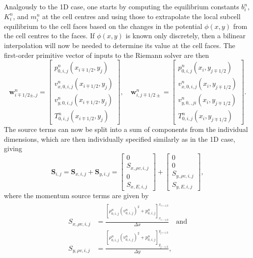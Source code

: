 Analgously to the 1D case, one starts by computing the equilibrium constants $b_i^n$, $K_i^n$, and $m_i^n$ at the cell centres and using those to extrapolate the local subcell equilibrium to the cell faces based on the changes in the potential $\phi(x,y)$ from the cell centres to the faces. If $\phi(x,y)$ is known only discretely, then a bilinear interpolation will now be needed to determine its value at the cell faces. The first-order primitive vector of inputs to the Riemann solver are then
\begin{equation} \label{eq:primitives2D1}
\mathbf{w}_{i\mp1/2\pm,j}^n=
\begin{bmatrix}
p_{0,i,j}^n(x_{i\mp1/2},y_j) \\ v_{x,0,i,j}^n(x_{i\mp1/2},y_j) \\ v_{y,0,i,j}^n(x_{i\mp1/2},y_j) \\ T_{0,i,j}^n(x_{i\mp1/2},y_j)
\end{bmatrix}
, \quad \mathbf{w}_{i,j\mp1/2\pm}^n=
\begin{bmatrix}
p_{0,i,j}^n(x_i,y_{j\mp1/2}) \\ v_{x,0,i,j}^n(x_i,y_{j\mp1/2}) \\ v_{y,0,,ji}^n(x_i,y_{j\mp1/2}) \\ T_{0,i,j}^n(x_i,y_{j\mp1/2})
\end{bmatrix}.
\end{equation}
The source terms can now be split into a sum of components from the individual dimensions, which are then individually specified similarly as in the 1D case, giving
\begin{equation}
\mathbf{S}_{i,j}=\mathbf{S}_{x,i,j}+\mathbf{S}_{y,i,j}=
\begin{bmatrix}
0 \\ S_{x,\rho v,i,j} \\ 0 \\ S_{x,E,i,j}
\end{bmatrix} +
\begin{bmatrix}
0 \\ 0 \\ S_{y,\rho v,i,j} \\ S_{y,E,i,j}
\end{bmatrix},
\end{equation}
where the momentum source terms are given by
\begin{align}
\begin{split}
S_{x,\rho v,i,j}&=\frac{\left[\rho_{0,i,j}^n(v_{0,i,j}^n)^2+p_{0,i,j}^n\right]_{x_{i-1/2}}^{x_{i+1/2}}}{\Delta x} \quad \textrm{and} \\
S_{y,\rho v,i,j}&=\frac{\left[\rho_{0,i,j}^n(v_{0,i,j}^n)^2+p_{0,i,j}^n\right]_{y_{j-1/2}}^{y_{j+1/2}}}{\Delta y},
\end{split}
\end{align}
